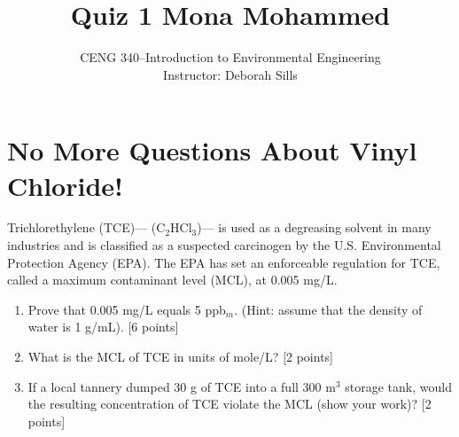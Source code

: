 \documentclass[12pt,letterpaper]{article}
\begin{document}
\setlength{\parindent}{0cm} 


\frenchspacing

\title {Quiz 1 Mona Mohammed} 
\author {CENG 340--Introduction to Environmental Engineering\\
Instructor: Deborah Sills}
\maketitle

\section *{No More Questions About Vinyl Chloride!}
Trichlorethylene (TCE)--- (C$_2$HCl$_3$)--- is used as a degreasing solvent in many industries and is classified as a suspected carcinogen by the U.S. Environmental Protection Agency (EPA).  The EPA has set an enforceable regulation for TCE, called a maximum contaminant level (MCL), at 0.005 mg/L. 
\begin{enumerate}
\item Prove that 0.005 mg/L equals 5 ppb$_m$. (Hint: assume that the density of water is 1 g/mL). [6 points] 

\vspace{2.3in}
\item What is the MCL of TCE in units of mole/L? [2 points] 

\vspace{1in}
\item If a local tannery dumped 30 g of TCE into a full 300 m$^3$ storage tank, would the resulting concentration of TCE violate the MCL (show your work)? [2 points] 


\end{enumerate}
\end{document}

